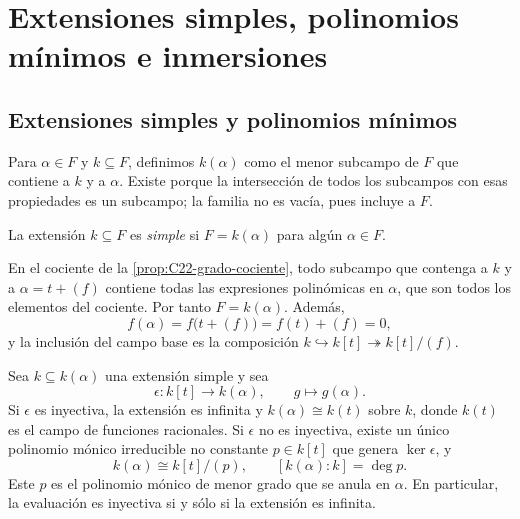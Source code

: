 \section{Extensiones simples, polinomios mínimos e inmersiones}\label{sec:campos-simples}

\subsection{Extensiones simples y polinomios mínimos}\label{tema:22-2-1}\label{tema:22-2-2}\label{tema:22-2-3}
Para $\alpha\in F$ y $k\subseteq F$, definimos $k(\alpha)$ como el menor subcampo de $F$ que contiene a $k$ y a $\alpha$. Existe porque la intersección de todos los subcampos con esas propiedades es un subcampo; la familia no es vacía, pues incluye a $F$.
\begin{defi}
La extensión $k\subseteq F$ es \emph{simple} si $F=k(\alpha)$ para algún $\alpha\in F$.
\end{defi}
En el cociente de la \cref{prop:C22-grado-cociente}, todo subcampo que contenga a $k$ y a $\alpha=t+(f)$ contiene todas las expresiones polinómicas en $\alpha$, que son todos los elementos del cociente. Por tanto $F=k(\alpha)$. Además,
\[
f(\alpha)=f\bigl(t+(f)\bigr)=f(t)+(f)=0,
\]
y la inclusión del campo base es la composición $k\hookrightarrow k[t]\twoheadrightarrow k[t]/(f)$.

\begin{prop}\label{prop:C22-simple}
Sea $k\subseteq k(\alpha)$ una extensión simple y sea
\[
\epsilon:k[t]\to k(\alpha),\qquad g\longmapsto g(\alpha).
\]
Si $\epsilon$ es inyectiva, la extensión es infinita y $k(\alpha)\cong k(t)$ sobre $k$, donde $k(t)$ es el campo de funciones racionales. Si $\epsilon$ no es inyectiva, existe un único polinomio mónico irreducible no constante $p\in k[t]$ que genera $\ker\epsilon$, y
\[
k(\alpha)\cong k[t]/(p),\qquad [k(\alpha):k]=\deg p.
\]
Este $p$ es el polinomio mónico de menor grado que se anula en $\alpha$. En particular, la evaluación es inyectiva si y sólo si la extensión es infinita.
\end{prop}

